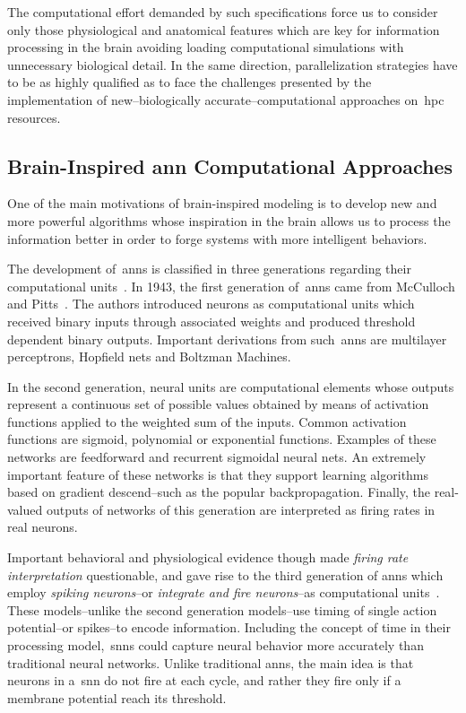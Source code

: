 \documentclass[10pt,journal,compsoc]{IEEEtran}
\begin{document}
The computational effort demanded by such specifications force us to consider only those physiological and anatomical features which are key for information processing in the brain avoiding loading computational simulations with unnecessary biological detail. In the same direction, parallelization strategies have to be as highly qualified as to face the challenges presented by the implementation of new--biologically accurate--computational approaches on~\gls{hpc} resources.





\subsection{Brain-Inspired \gls{ann} Computational Approaches}

One of the main motivations of brain-inspired modeling is to develop new and more powerful algorithms whose inspiration in the brain allows us to process the information better in order to forge systems with more intelligent behaviors.

The development of~\glspl{ann} is classified in three generations regarding their computational units~\cite{MAASS19971659,10.1007/978-3-642-03156-4_17}. In 1943, the first generation of~\glspl{ann} came from McCulloch and Pitts~\cite{McCulloch1990ALC}. The authors introduced neurons as computational units which received binary inputs through associated weights and produced threshold dependent binary outputs. Important derivations from such~\glspl{ann} are multilayer perceptrons, Hopfield nets and Boltzman Machines.

In the second generation, neural units are computational elements whose outputs represent a continuous set of possible values obtained by means of activation functions applied to the weighted sum of the inputs. Common activation functions are sigmoid, polynomial or exponential functions. Examples of these networks are feedforward and recurrent sigmoidal neural nets. An extremely important feature of these networks is that they support learning algorithms based on gradient descend--such as the popular backpropagation. Finally, the real-valued outputs of networks of this generation are interpreted as firing rates in real neurons. 

Important behavioral and physiological evidence though made \emph{firing rate interpretation} questionable, and gave rise to the third generation of \glspl{ann} which employ \emph{spiking neurons}--or \emph{integrate and fire neurons}--as computational units~\cite{HODGKIN199025,Izhikevich2004SpiketimingDO,1333071}. These models--unlike the second generation models--use timing of single action potential--or spikes--to encode information. Including the concept of time in their processing model,~\glspl{snn} could capture neural behavior more accurately than traditional neural networks. Unlike traditional \glspl{ann}, the main idea is that neurons in a~\gls{snn} do not fire at each cycle, and rather they fire only if a membrane potential reach its threshold.
\end{document}
